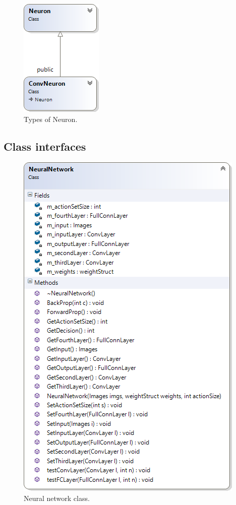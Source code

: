 \documentclass[10pt]{article}
\begin{document}
		\bigskip
		\bigskip
		\begin{figure}[h]
			\centering			
			\includegraphics[scale=1]{img/typesOfNeuron}
			\caption{Types of Neuron.}
			\label{fig:neurontypes}	
		\end{figure}  
	\newpage
	\subsection{Class interfaces}
	
		\begin{figure}[h]
    		\centering
			\includegraphics[scale=0.8]{img/classNN}
			\caption{Neural network class.}
			\label{fig:nncd}
		\end{figure}	
		
\end{document}
